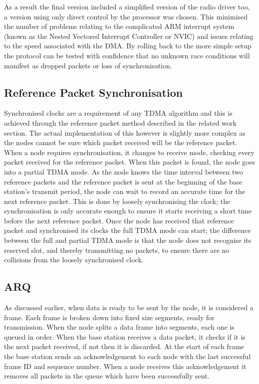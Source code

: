 \documentclass[parskip]{cs4rep}
\begin{document}
As a result the final version included a simplified version of the radio driver too, a version using only direct control by the processor was chosen. This minimised the number of problems relating to the complicated ARM interrupt system (known as the Nested Vectored Interrupt Controller or NVIC) and issues relating to the speed associated with the DMA. By rolling back to the more simple setup the protocol can be tested with confidence that no unknown race conditions will manifest as dropped packets or loss of synchronisation.

\subsection{Reference Packet Synchronisation}

Synchronised clocks are a requirement of any TDMA algorithm and this is achieved through the  reference packet method described in the related work section. The actual implementation of this however is slightly more complex as the nodes cannot be sure which packet received will be the reference packet. When a node requires synchronisation, it changes to receive mode, checking every packet received for the reference packet. When this packet is found, the node goes into a partial TDMA mode. As the node knows the time interval between two reference packets and the reference packet is sent at the beginning of the base station's transmit period, the node can wait to record an accurate time for the next reference packet. This is done by loosely synchronising the clock; the synchronisation is only accurate enough to ensure it starts receiving a short time before the next reference packet. Once the node has received that reference packet and synchronised its clocks the full TDMA mode can start; the difference between the full and partial TDMA mode is that the node does not recognise its reserved slot, and thereby transmitting no packets, to ensure there are no collisions from the loosely synchronised clock.

\subsection{ARQ}

As discussed earlier, when data is ready to be sent by the node, it is considered a frame. Each frame is broken down into fixed size segments, ready for transmission. When the node splits a data frame into segments, each one is queued in order. When the base station receives a data packet, it checks if it is the next packet received, if not then it is discarded. At the start of each frame the base station sends an acknowledgement to each node with the last successful frame ID and sequence number. When a node receives this acknowledgement it removes all packets in the queue which have been successfully sent. 
\end{document}
